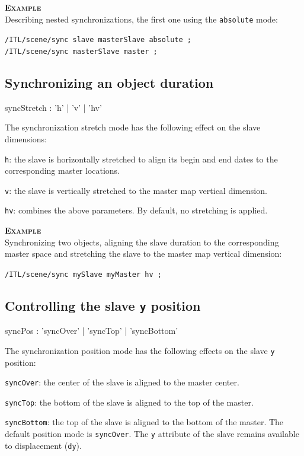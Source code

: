 \documentclass[a4paper,twoside]{report}
\newcommand{\subsublevel}[1]	{\subsection{#1}}
\newcommand{\OSC}[1]		{\texttt{#1}}
\newcommand{\values}[1]		{\texttt{#1}}
\newcommand{\example}		{\textbf{\hspace{-1.5cm}\textbf{\textsc{Example }}}}
\let\olditemize\itemize
\let\oldenditemize\enditemize
\renewenvironment{itemize} 	{\olditemize \setlength{\itemsep}{1mm}}{\oldenditemize}
\newcommand{\sample}	[1]			{\vspace{-2mm}\begin{center}\colorbox{mygrey}{
								\begin{minipage}[t]{0.9\columnwidth} 
								{\small \texttt{#1}}
								\end{minipage}}\end{center}}
\begin{document}
\example \\
Describing nested synchronizations, the first one using the \OSC{absolute} mode:
\sample{/ITL/scene/sync slave masterSlave absolute ;\\
/ITL/scene/sync masterSlave master ;
}

\subsublevel{Synchronizing an object duration}

\begin{rail}
syncStretch : 'h' | 'v' | 'hv'
\end{rail}

The synchronization stretch mode has the following effect on the slave dimensions:
\begin{itemize}
\item \OSC{h}: the slave is horizontally stretched to align its begin and end dates to the corresponding master locations.
\item \OSC{v}: the slave is vertically stretched to the master map vertical dimension.
\item \OSC{hv}: combines the above parameters.
\end{itemize}
By default, no stretching is applied.

\example \\
Synchronizing two objects, aligning the slave duration to the corresponding master space and stretching the slave to the master map vertical dimension:
\sample{/ITL/scene/sync mySlave myMaster hv ;}


\subsublevel{Controlling the slave \OSC{y} position}

\begin{rail}
syncPos : 'syncOver' | 'syncTop' | 'syncBottom'
\end{rail}

The synchronization position mode has the following effects on the slave \values{y} position:
\begin{itemize}
\item \OSC{syncOver}: the center of the slave is aligned to the master center.
\item \OSC{syncTop}: the bottom of the slave is aligned to the top of the master.
\item \OSC{syncBottom}: the top of the slave is aligned to the bottom of the master.
\end{itemize}
The default position mode is \OSC{syncOver}. The \OSC{y} attribute of the slave remains available to displacement (\OSC{dy}). 
\end{document}
